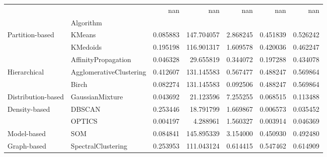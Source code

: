 \begin{tabular}{llrrrrr}
 &  & nan & nan & nan & nan & nan \\
 & Algorithm &  &  &  &  &  \\
\multirow[c]{3}{*}{Partition-based} & KMeans & 0.085883 & 147.704057 & 2.868245 & 0.451839 & 0.526242 \\
 & KMedoids & 0.195198 & 116.901317 & 1.609578 & 0.420036 & 0.462247 \\
 & AffinityPropagation & 0.046328 & 29.655819 & 0.344072 & 0.197288 & 0.434078 \\
\multirow[c]{2}{*}{Hierarchical} & AgglomerativeClustering & 0.412607 & 131.145583 & 0.567477 & 0.488247 & 0.569864 \\
 & Birch & 0.082274 & 131.145583 & 0.092506 & 0.488247 & 0.569864 \\
Distribution-based & GaussianMixture & 0.043692 & 21.123596 & 7.255255 & 0.068515 & 0.113488 \\
\multirow[c]{2}{*}{Density-based} & DBSCAN & 0.253446 & 18.791799 & 1.669867 & 0.006573 & 0.035452 \\
 & OPTICS & 0.004197 & 4.288961 & 1.560327 & 0.003914 & 0.046369 \\
Model-based & SOM & 0.084841 & 145.895339 & 3.154000 & 0.450930 & 0.492480 \\
Graph-based & SpectralClustering & 0.253953 & 111.043124 & 0.614415 & 0.547462 & 0.614909 \\
\end{tabular}
